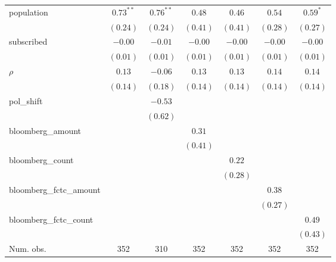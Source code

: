 \begin{table}[!h]
\begin{center}
\begin{tabular}{l c c c c c c }
population              & $0.73^{**}$  & $0.76^{**}$  & $0.48$       & $0.46$       & $0.54$       & $0.59^{*}$   \\
                        & $(0.24)$     & $(0.24)$     & $(0.41)$     & $(0.41)$     & $(0.28)$     & $(0.27)$     \\
subscribed              & $-0.00$      & $-0.01$      & $-0.00$      & $-0.00$      & $-0.00$      & $-0.00$      \\
                        & $(0.01)$     & $(0.01)$     & $(0.01)$     & $(0.01)$     & $(0.01)$     & $(0.01)$     \\
$\rho$                  & $0.13$       & $-0.06$      & $0.13$       & $0.13$       & $0.14$       & $0.14$       \\
                        & $(0.14)$     & $(0.18)$     & $(0.14)$     & $(0.14)$     & $(0.14)$     & $(0.14)$     \\
pol\_shift              &              & $-0.53$      &              &              &              &              \\
                        &              & $(0.62)$     &              &              &              &              \\
bloomberg\_amount       &              &              & $0.31$       &              &              &              \\
                        &              &              & $(0.41)$     &              &              &              \\
bloomberg\_count        &              &              &              & $0.22$       &              &              \\
                        &              &              &              & $(0.28)$     &              &              \\
bloomberg\_fctc\_amount &              &              &              &              & $0.38$       &              \\
                        &              &              &              &              & $(0.27)$     &              \\
bloomberg\_fctc\_count  &              &              &              &              &              & $0.49$       \\
                        &              &              &              &              &              & $(0.43)$     \\
\midrule
Num. obs.               & 352          & 310          & 352          & 352          & 352          & 352          \\

\end{tabular}
\end{center}
\end{table}
